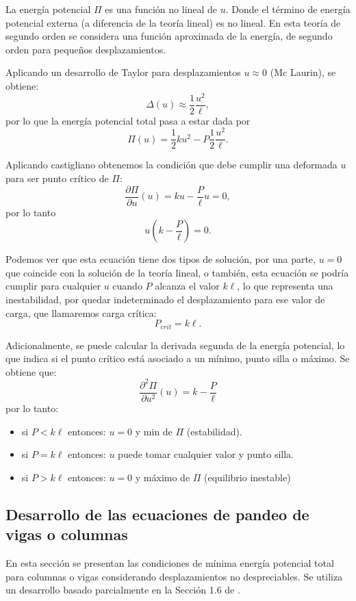 La energía potencial $\Pi$ es una función no lineal de $u$. Donde el término de energía potencial externa (a diferencia de la teoría lineal) es no lineal. En esta teoría de segundo orden se considera una función aproximada de la energía, de segundo orden para pequeños desplazamientos. %

Aplicando un desarrollo de Taylor para desplazamientos $u \approx 0$ (Mc Laurin), se obtiene:
%
$$
\Delta(u) \approx \frac{1}{2} \frac{u^2}{\ell} ,
$$
por lo que la energía potencial total pasa a estar dada por
$$
\Pi(u) = \frac{1}{2} k u^2 - P \frac{1}{2} \frac{u^2}{\ell} .
$$

Aplicando castigliano obtenemos la condición que debe cumplir una deformada $u$ para ser punto crítico de $\Pi$:
%
$$
\frac{\partial \Pi}{\partial u}(u) = k u - \frac{P}{\ell}  u   = 0,
$$
por lo tanto
$$
u \left(  k - \frac{P}{\ell} \right) = 0.
$$

Podemos ver que esta ecuación tiene dos tipos de solución, por una parte, $u=0$ que coincide con la solución de la teoría lineal, o también, esta ecuación se podría cumplir para cualquier $u$ cuando $P$ alcanza el valor $k\ell$, lo que representa una inestabilidad, por quedar indeterminado el desplazamiento para ese valor de carga, que llamaremos carga crítica:
\begin{equation}
P_{crit} = k \ell.
\end{equation}

Adicionalmente, se puede calcular la derivada segunda de la energía potencial, lo que indica si el punto crítico está asociado a un mínimo, punto silla o máximo. Se obtiene que:
$$
\frac{\partial^2 \Pi}{\partial u^2}(u) = k - \frac{P}{ \ell}
$$
%
por lo tanto:
\begin{itemize}
%
\item si $P< k \ell$ entonces: $u=0$ y min de $\Pi$ (estabilidad).
%
\item si $P= k \ell$ entonces: $u$ puede tomar cualquier valor y punto silla.
%
\item si $P> k \ell$ entonces: $u=0$ y máximo de $\Pi$ (equilibrio inestable)
\end{itemize}


\subsection{Desarrollo de las ecuaciones de pandeo de vigas o columnas}

En esta sección se presentan las condiciones de mínima energía potencial total para columnas o vigas considerando desplazamientos no despreciables. Se utiliza un desarrollo basado parcialmente en la Sección 1.6 de \citep{yoo2011}.

